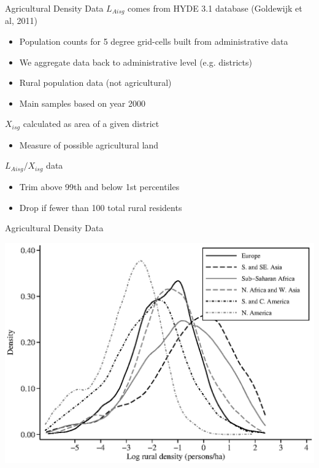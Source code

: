 \documentclass[10pt, xcolor=dvipsnames]{beamer}
\begin{document}
\begin{frame}{Agricultural Density Data}
$L_{Aisg}$ comes from HYDE 3.1 database (Goldewijk et al, 2011)
\begin{itemize}
  \item Population counts for 5 degree grid-cells built from administrative data
  \item We aggregate data back to administrative level (e.g. districts)
  \item Rural population data (not agricultural)
  \item Main samples based on year 2000
\end{itemize}
$X_{isg}$ calculated as area of a given district
\begin{itemize}
  \item Measure of possible agricultural land
\end{itemize}
$L_{Aisg}/X_{isg}$ data 
\begin{itemize}
  \item Trim above 99th and below 1st percentiles
  \item Drop if fewer than 100 total rural residents
\end{itemize}
\end{frame}

\begin{frame}{Agricultural Density Data}
\begin{center}
\includegraphics[width=.8\textwidth]{fig_dens_rurd.eps}
\end{center}
\end{frame}
\end{document}
